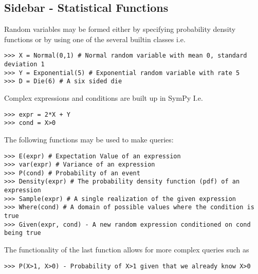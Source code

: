 \subsection{Sidebar - Statistical Functions}

Random variables may be formed either by specifying probability density functions or by using one of the several builtin classes i.e. 
\begin{lstlisting}
>>> X = Normal(0,1) # Normal random variable with mean 0, standard deviation 1
>>> Y = Exponential(5) # Exponential random variable with rate 5
>>> D = Die(6) # A six sided die
\end{lstlisting}

Complex expressions and conditions are built up in SymPy I.e.
\begin{lstlisting}
>>> expr = 2*X + Y
>>> cond = X>0
\end{lstlisting}

The following functions may be used to make queries:

\begin{lstlisting}
>>> E(expr) # Expectation Value of an expression
>>> var(expr) # Variance of an expression
>>> P(cond) # Probability of an event
>>> Density(expr) # The probability density function (pdf) of an expression
>>> Sample(expr) # A single realization of the given expression
>>> Where(cond) # A domain of possible values where the condition is true
>>> Given(expr, cond) - A new random expression conditioned on cond being true
\end{lstlisting}

The functionality of the last function allows for more complex queries such as 
\begin{lstlisting}
>>> P(X>1, X>0) - Probability of X>1 given that we already know X>0
\end{lstlisting}

